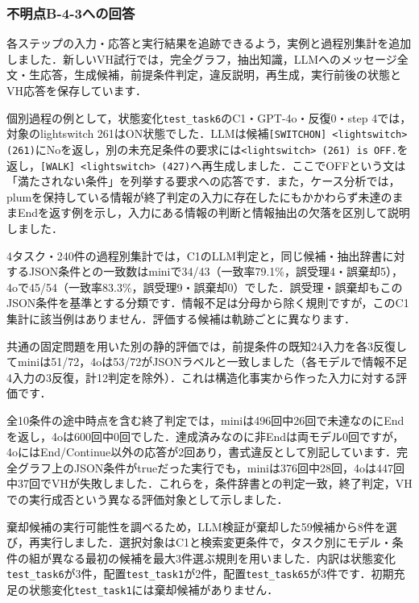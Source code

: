 \documentclass{jsarticle}
\begin{document}
\subsubsection*{不明点B-4-3への回答}
各ステップの入力・応答と実行結果を追跡できるよう，実例と過程別集計を追加しました．新しいVH試行では，完全グラフ，抽出知識，LLMへのメッセージ全文・生応答，生成候補，前提条件判定，違反説明，再生成，実行前後の状態とVH応答を保存しています．

個別過程の例として，状態変化\texttt{test\_task6}のC1・GPT-4o・反復0・step 4では，対象のlightswitch 261はON状態でした．LLMは候補\texttt{[SWITCHON] <lightswitch> (261)}にNoを返し，別の未充足条件の要求には\texttt{<lightswitch> (261) is OFF.}を返し，\texttt{[WALK] <lightswitch> (427)}へ再生成しました．ここでOFFという文は「満たされない条件」を列挙する要求への応答です．また，ケース分析では，plumを保持している情報が終了判定の入力に存在したにもかかわらず未達のままEndを返す例を示し，入力にある情報の判断と情報抽出の欠落を区別して説明しました．

4タスク・240件の過程別集計では，C1のLLM判定と，同じ候補・抽出辞書に対するJSON条件との一致数はminiで34/43（一致率79.1\%，誤受理4・誤棄却5），4oで45/54（一致率83.3\%，誤受理9・誤棄却0）でした．誤受理・誤棄却もこのJSON条件を基準とする分類です．情報不足は分母から除く規則ですが，このC1集計に該当例はありません．評価する候補は軌跡ごとに異なります．

共通の固定問題を用いた別の静的評価では，前提条件の既知24入力を各3反復してminiは51/72，4oは53/72がJSONラベルと一致しました（各モデルで情報不足4入力の3反復，計12判定を除外）．これは構造化事実から作った入力に対する評価です．

全10条件の途中時点を含む終了判定では，miniは496回中26回で未達なのにEndを返し，4oは600回中0回でした．達成済みなのに非Endは両モデル0回ですが，4oにはEnd/Continue以外の応答が2回あり，書式違反として別記しています．完全グラフ上のJSON条件がtrueだった実行でも，miniは376回中28回，4oは447回中37回でVHが失敗しました．これらを，条件辞書との判定一致，終了判定，VHでの実行成否という異なる評価対象として示しました．

棄却候補の実行可能性を調べるため，LLM検証が棄却した59候補から8件を選び，再実行しました．選択対象はC1と検索変更条件で，タスク別にモデル・条件の組が異なる最初の候補を最大3件選ぶ規則を用いました．内訳は状態変化\texttt{test\_task6}が3件，配置\texttt{test\_task1}が2件，配置\texttt{test\_task65}が3件です．初期充足の状態変化\texttt{test\_task1}には棄却候補がありません．
\end{document}
